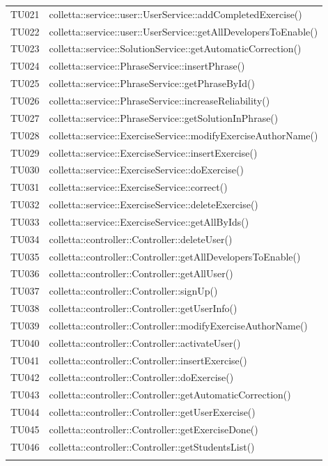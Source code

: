\begin{tabularx}{\textwidth}{cX}
	TU021 & colletta::service::user::UserService::addCompletedExercise() \\
	TU022 & colletta::service::user::UserService::getAllDevelopersToEnable() \\
	TU023 & colletta::service::SolutionService::getAutomaticCorrection() \\
	TU024 & colletta::service::PhraseService::insertPhrase() \\
	TU025 & colletta::service::PhraseService::getPhraseById() \\
	TU026 & colletta::service::PhraseService::increaseReliability() \\
	TU027 & colletta::service::PhraseService::getSolutionInPhrase() \\
	TU028 & colletta::service::ExerciseService::modifyExerciseAuthorName() \\
	TU029 & colletta::service::ExerciseService::insertExercise() \\
	TU030 & colletta::service::ExerciseService::doExercise() \\
	TU031 & colletta::service::ExerciseService::correct() \\
	TU032 & colletta::service::ExerciseService::deleteExercise() \\
	TU033 & colletta::service::ExerciseService::getAllByIds() \\
	TU034 & colletta::controller::Controller::deleteUser() \\
	TU035 & colletta::controller::Controller::getAllDevelopersToEnable() \\
	TU036 & colletta::controller::Controller::getAllUser() \\
	TU037 & colletta::controller::Controller::signUp() \\
	TU038 & colletta::controller::Controller::getUserInfo() \\
	TU039 & colletta::controller::Controller::modifyExerciseAuthorName() \\
	TU040 & colletta::controller::Controller::activateUser() \\
	TU041 & colletta::controller::Controller::insertExercise() \\
	TU042 & colletta::controller::Controller::doExercise() \\
	TU043 & colletta::controller::Controller::getAutomaticCorrection() \\
	TU044 & colletta::controller::Controller::getUserExercise() \\
	TU045 & colletta::controller::Controller::getExerciseDone() \\
	TU046 & colletta::controller::Controller::getStudentsList() \\
	
	\rowcolor{white}
	\caption{Tracciamento test di unità - metodi}
	\label{tab:tracciamentotestunità}
\end{tabularx}
